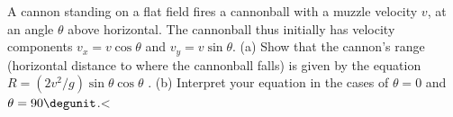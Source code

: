 A cannon standing on a flat field fires a cannonball
with a muzzle velocity $v$, at an angle $\theta $ above
horizontal. The cannonball thus initially has velocity
components $v_x=v \cos  \theta $ and $v_y=v \sin \theta $.\hwendpart
(a) Show that the cannon's range (horizontal distance to
where the cannonball falls) is given by the equation $R=(2v^2/g)\sin\theta\cos\theta$ .\hwendpart
(b) Interpret your equation in the cases of $\theta =0$
and $\theta =90\degunit$.<%
